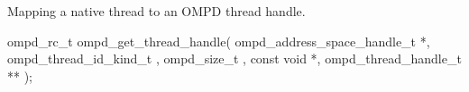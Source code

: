 %
%
\label{ompd:ompd_get_master_thread_in_parallel}
%
%
%
%
%


\label{ompd:ompd_get_thread_handle}
\summary
Mapping a native thread to an OMPD thread handle.
\format
\cspecificstart
\begin{boxedcode}
	ompd\_rc\_t ompd\_get\_thread\_handle(
	ompd\_address\_space\_handle\_t   *, 
	ompd\_thread\_id\_kind\_t           ,
	ompd\_size\_t                    , 
	const void                    *, 
	ompd\_thread\_handle\_t         **
	);
\end{boxedcode}
\cspecificend

